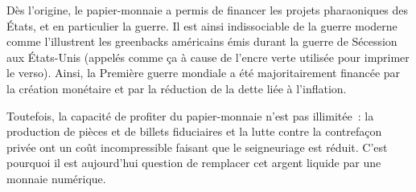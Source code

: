
Dès l'origine, le papier-monnaie a permis de financer les projets pharaoniques des États, et en particulier la guerre. Il est ainsi indissociable de la guerre moderne comme l'illustrent les greenbacks américains émis durant la guerre de Sécession aux États-Unis (appelés comme ça à cause de l'encre verte utilisée pour imprimer le verso). Ainsi, la Première guerre mondiale a été majoritairement financée par la création monétaire et par la réduction de la dette liée à l'inflation.


Toutefois, la capacité de profiter du papier-monnaie n'est pas illimitée~: la production de pièces et de billets fiduciaires et la lutte contre la contrefaçon privée ont un coût incompressible faisant que le seigneuriage est réduit. C'est pourquoi il est aujourd'hui question de remplacer cet argent liquide par une monnaie numérique.


